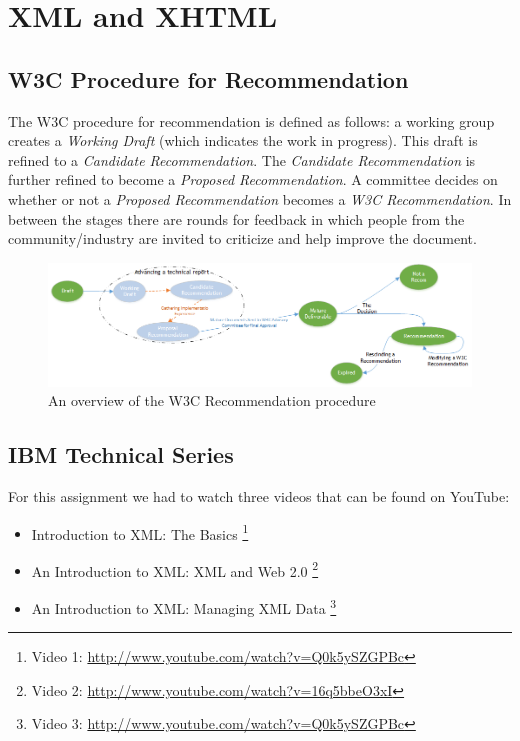 
\section{XML and XHTML}

\subsection{W3C Procedure for Recommendation}

The W3C procedure for recommendation is defined as follows: a working group creates a \textit{Working Draft} (which indicates the work in progress). This draft is refined to a \textit{Candidate Recommendation}. The \textit{Candidate Recommendation} is further refined to become a \textit{Proposed Recommendation}. A committee decides on whether or not a \textit{Proposed Recommendation} becomes a \textit{W3C Recommendation}. In between the stages there are rounds for feedback in which people from the community/industry are invited to criticize and help improve the document.

\vspace{10pt}

\begin{figure}[here]
	\centering
	\includegraphics[width=1.0\textwidth]{images/w3c.png}
	\caption{An overview of the W3C Recommendation procedure}
	\label{fig:RecommendationProcedure}
\end{figure}

\subsection{IBM Technical Series}

For this assignment we had to watch three videos that can be found on YouTube:
\begin{itemize}
\item Introduction to XML: The Basics
\footnote{Video 1: \url{http://www.youtube.com/watch?v=Q0k5ySZGPBc}}
\item An Introduction to XML: XML and Web 2.0
\footnote{Video 2: \url{http://www.youtube.com/watch?v=16q5bbeO3xI}}
\item An Introduction to XML: Managing XML Data
\footnote{Video 3: \url{http://www.youtube.com/watch?v=Q0k5ySZGPBc}}
\end{itemize}


